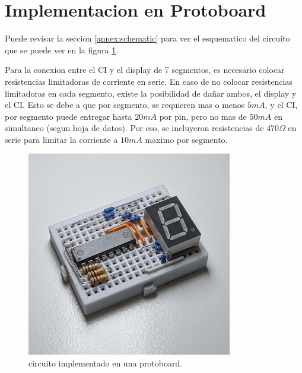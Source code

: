   \section{Implementacion en Protoboard}
    Puede revisar la seccion \ref{annex:schematic} para ver el esquematico del circuito que se puede ver en la figura
    \ref{fig:proto-cd4511}.

    Para la conexion entre el CI y el display de 7 segmentos, es necesario colocar resistencias
    limitadoras de corriente en serie. En caso de no colocar resistencias limitadoras en cada segmento, existe la
    posibilidad de dañar ambos, el display y el CI. Esto se debe a que por segmento, se requieren mas o menos $5mA$, y el
    CI, por segmento puede entregar hasta $20mA$ por pin, pero no mas de $50mA$ en simultaneo (segun hoja de datos).
    Por eso, se incluyeron resistencias de $470\Omega$ en serie para limitar la corriente a $10mA$ maximo por segmento.

    \begin{figure}[!ht]
      \centering
      \includegraphics[width=0.8\textwidth]{pictures/cd4511-proto.jpg}
      \caption{circuito implementado en una protoboard.}
      \label{fig:proto-cd4511}
    \end{figure}
